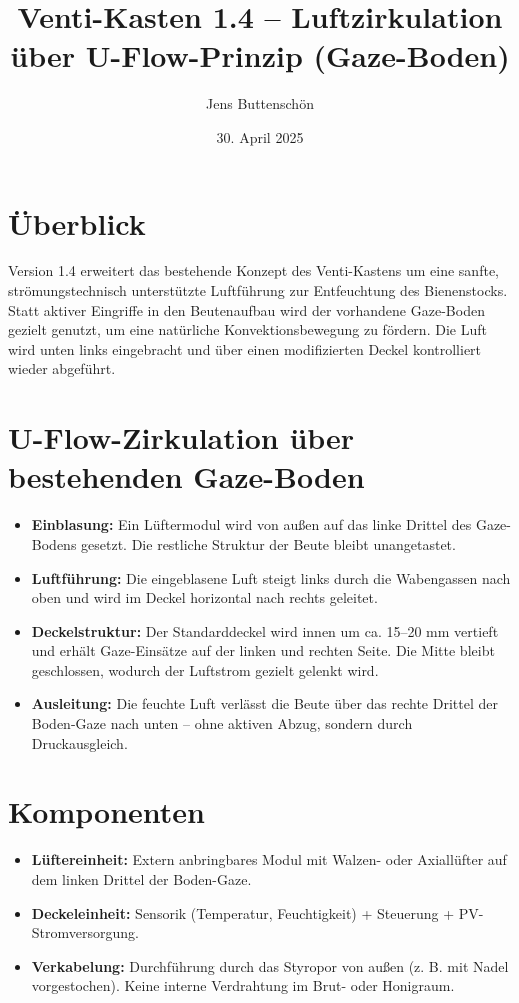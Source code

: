 \documentclass[11pt,a4paper]{article}
\title{\textbf{Venti-Kasten 1.4 – Luftzirkulation über U-Flow-Prinzip (Gaze-Boden)}}
\author{Jens Buttenschön}
\date{30. April 2025}
\begin{document}
\maketitle

\section*{Überblick}

Version 1.4 erweitert das bestehende Konzept des Venti-Kastens um eine sanfte, strömungstechnisch unterstützte Luftführung zur Entfeuchtung des Bienenstocks. Statt aktiver Eingriffe in den Beutenaufbau wird der vorhandene Gaze-Boden gezielt genutzt, um eine natürliche Konvektionsbewegung zu fördern. Die Luft wird unten links eingebracht und über einen modifizierten Deckel kontrolliert wieder abgeführt.

\section*{U-Flow-Zirkulation über bestehenden Gaze-Boden}

\begin{itemize}[leftmargin=1.5em]
  \item \textbf{Einblasung:} Ein Lüftermodul wird von außen auf das linke Drittel des Gaze-Bodens gesetzt. Die restliche Struktur der Beute bleibt unangetastet.
  \item \textbf{Luftführung:} Die eingeblasene Luft steigt links durch die Wabengassen nach oben und wird im Deckel horizontal nach rechts geleitet.
  \item \textbf{Deckelstruktur:} Der Standarddeckel wird innen um ca. 15–20 mm vertieft und erhält Gaze-Einsätze auf der linken und rechten Seite. Die Mitte bleibt geschlossen, wodurch der Luftstrom gezielt gelenkt wird.
  \item \textbf{Ausleitung:} Die feuchte Luft verlässt die Beute über das rechte Drittel der Boden-Gaze nach unten – ohne aktiven Abzug, sondern durch Druckausgleich.
\end{itemize}

\section*{Komponenten}

\begin{itemize}[leftmargin=1.5em]
  \item \textbf{Lüftereinheit:} Extern anbringbares Modul mit Walzen- oder Axiallüfter auf dem linken Drittel der Boden-Gaze.
  \item \textbf{Deckeleinheit:} Sensorik (Temperatur, Feuchtigkeit) + Steuerung + PV-Stromversorgung.
  \item \textbf{Verkabelung:} Durchführung durch das Styropor von außen (z. B. mit Nadel vorgestochen). Keine interne Verdrahtung im Brut- oder Honigraum.
\end{itemize}
\end{document}
